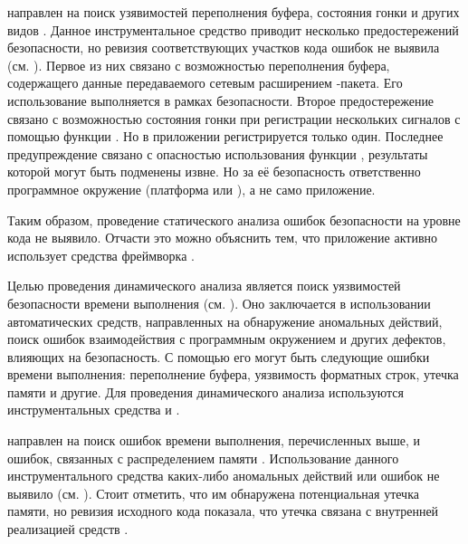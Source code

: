%
 направлен на поиск узявимостей переполнения буфера, состояния гонки и других видов . 
%
Данное инструментальное средство приводит несколько предостережений безопасности, но ревизия соответствующих участков кода ошибок не выявила (см. ). 
%
Первое из них связано с возможностью переполнения буфера, содержащего данные передаваемого сетевым расширением -пакета. 
%
Его использование выполняется в рамках безопасности. 
%
Второе предостережение связано с возможностью состояния гонки при регистрации нескольких сигналов с помощью функции . 
%
Но в приложении регистрируется только один. 
%
Последнее предупреждение связано с опасностью использования функции , результаты которой могут быть подменены извне. 
%
Но за её безопасность ответственно программное окружение \PeerHood (платформа или ), а не само приложение.  

%
Таким образом, проведение статического анализа \PeerHood ошибок безопасности на уровне кода не выявило. 
%
Отчасти это можно объяснить тем, что приложение активно использует средства фреймворка \Qt. 



%
Целью проведения динамического анализа является поиск уязвимостей безопасности времени выполнения (см. ). 
%
Оно заключается в использовании автоматических средств, направленных на обнаружение аномальных действий, поиск ошибок взаимодействия с программным окружением и других дефектов, влияющих на безопасность. 
%
С помощью его могут быть следующие ошибки времени выполнения: переполнение буфера, уязвимость форматных строк, утечка памяти и другие. 
%
Для проведения динамического анализа \PeerHood используются инструментальных средства  и . 

%
 направлен на поиск ошибок времени выполнения, перечисленных выше, и ошибок, связанных с распределением памяти . 
%
Использование данного инструментального средства каких-либо аномальных действий или ошибок не выявило (см. ). 
%
Стоит отметить, что им обнаружена потенциальная утечка памяти, но ревизия исходного кода \PeerHood показала, что утечка связана с внутренней реализацией средств \Qt. 


